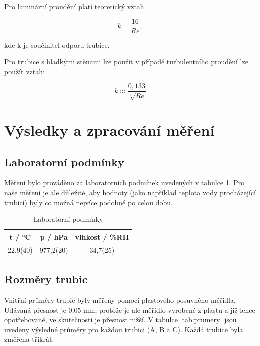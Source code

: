     Pro laminární proudění platí teoretický vztah

    \begin{equation}
        k = \frac{16}{Re},
    \end{equation}

    kde k je součinitel odporu trubice.

    Pro trubice s hladkými stěnami lze použít v případě turbulentního proudění lze použít vztah:

    \begin{equation}
        k \approx \frac{0,133}{\sqrt[4]{Re}}
    \end{equation}
\section{Výsledky a zpracování měření}

\subsection{Laboratorní podmínky}

    Měření bylo prováděno za laboratorních podmínek uvedených v tabulce \ref{tab:lab_pod}. Pro naše měření je ale důležité, aby hodnoty (jako například teplota vody procházející  trubicí) byly co možná nejvíce podobné po celou dobu.

    \begin{table}[h]
        \centering
        \caption{Laboratorní podmínky}
        \label{tab:lab_pod}
        \begin{tabular}{|c|c|c|} 
        \hline
            t / °C & p / hPa & vlhkost / \%RH  \\ 
        \hline
            22,9(40)   & 977,2(20)   & 34,7(25)            \\
        \hline
        \end{tabular}
    \end{table}

\subsection{Rozměry trubic}

    Vnitřní průměry trubic byly měřeny pomocí plastového posuvného měřidla. Udávaná přesnost je 0,05 mm, protože je ale měřidlo vyrobené z plastu a již lehce opotřebované, ve skutečnosti je přesnost nižší. V tabulce \ref{tab:prumery} jsou uvedeny výsledné průměry pro každou trubici (A, B a C). Každá trubice byla změřena třikrát.

